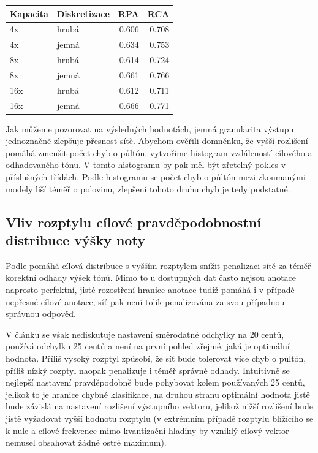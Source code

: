    \begin{tabular}{llrr}
    \toprule
    Kapacita & Diskretizace &  RPA &  RCA \\
    \midrule
     4x &        hrubá      & 0.606 & 0.708 \\
     4x &        jemná      & 0.634 & 0.753 \\
     8x &        hrubá      & 0.614 & 0.724 \\
     8x &        jemná      & 0.661 & 0.766 \\
    16x &        hrubá      & 0.612 & 0.711 \\
    16x &        jemná      & 0.666 & 0.771 \\
    \bottomrule
    \end{tabular}


Jak můžeme pozorovat na výsledných hodnotách, jemná granularita výstupu jednoznačně zlepšuje přesnost sítě. Abychom ověřili domněnku, že vyšší rozlišení pomáhá zmenšit počet chyb o půltón, vytvoříme histogram vzdáleností cílového a odhadovaného tónu. V tomto histogramu by pak měl být zřetelný pokles v příslušných třídách. Podle histogramu se počet chyb o půltón mezi zkoumanými modely liší téměř o polovinu, zlepšení tohoto druhu chyb je tedy podstatné.

\subsection{Vliv rozptylu cílové pravděpodobnostní distribuce výšky noty}

Podle \cite{Bittner2017} pomáhá cílová distribuce s vyšším rozptylem snížit penalizaci sítě za téměř korektní odhady výšek tónů. Mimo to u dostupných dat často nejsou anotace naprosto perfektní, jisté rozostření hranice anotace tudíž pomáhá i v případě nepřesné cílové anotace, síť pak není tolik penalizována za svou případnou správnou odpověď. 

V článku se však nediskutuje nastavení směrodatné odchylky na 20 centů, \cite{Kim2018} používá odchylku 25 centů a není na první pohled zřejmé, jaká je optimální hodnota. Příliš vysoký rozptyl způsobí, že síť bude tolerovat více chyb o půltón, příliš nízký rozptyl naopak penalizuje i téměř správné odhady. Intuitivně se nejlepší nastavení pravděpodobně bude pohybovat kolem používaných 25 centů, jelikož to je hranice chybné klasifikace, na druhou stranu optimální hodnota jistě bude závislá na nastavení rozlišení výstupního vektoru, jelikož nižší rozlišení bude jistě vyžadovat vyšší hodnotu rozptylu (v extrémním případě rozptylu blížícího se k nule a cílové frekvence mimo kvantizační hladiny by vzniklý cílový vektor nemusel obsahovat žádné ostré maximum).

